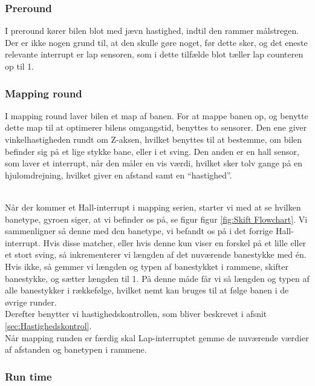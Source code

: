 \subsubsection{Preround}
I preround kører bilen blot med jævn hastighed, indtil den rammer målstregen. Der er ikke nogen grund til, at den skulle gøre noget, før dette sker, og det eneste relevante interrupt er lap sensoren, som i dette tilfælde blot tæller lap counteren op til 1.

\subsubsection{Mapping round}
I mapping round laver bilen et map af banen. For at mappe banen op, og benytte dette map til at optimerer bilens omgangstid, benyttes to sensorer. Den ene giver vinkelhastigheden rundt om Z-aksen, hvilket benyttes til at bestemme, om bilen befinder sig på et lige stykke bane, eller i et sving. Den anden er en hall sensor, som laver et interrupt, når den måler en vis værdi, hvilket sker tolv gange på en hjulomdrejning, hvilket giver en afstand samt en ``hastighed''.
\\\


Når der kommer et Hall-interrupt i mapping serien, starter vi med at se hvilken banetype, gyroen siger, at vi befinder os på, se figur figur \ref{fig:Skift Flowchart}. Vi sammenligner så denne med den banetype, vi befandt os på i det forrige Hall-interrupt. Hvis disse matcher, eller hvis denne kun viser en forskel på et lille eller et stort sving, så inkrementerer vi længden af det nuværende banestykke med én. Hvis ikke, så gemmer vi længden og typen af banestykket i rammene, skifter banestykke, og sætter længden til 1. På denne måde får vi så længden og typen af alle banestykker i rækkefølge, hvilket nemt kan bruges til at følge banen i de øvrige runder.
\\
Derefter benytter vi hastighedskontrollen, som bliver beskrevet i afsnit \ref{sec:Hastighedskontrol}.
\\
Når mapping runden er færdig skal Lap-interruptet gemme de nuværende værdier af afstanden og banetypen i rammene. 

\subsubsection{Run time}

